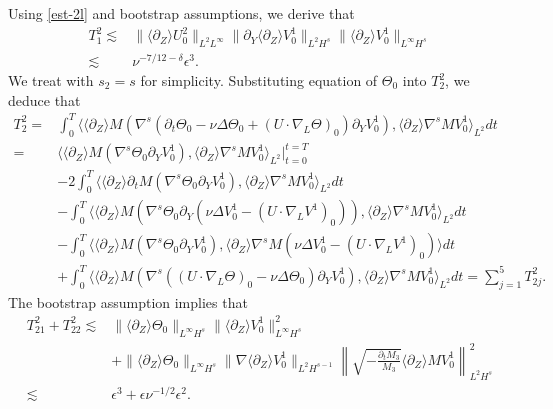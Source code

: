 \documentclass[12pt]{article}
\def\d{\mathrm{d}}
\newcommand{\wtb}{\langle\partial_Z\rangle }
\newcommand{\wtc}{(1,\partial_Z)}
\numberwithin{equation}{section}
\begin{document}
	Using \eqref{est-2l} and bootstrap assumptions, we derive that
	\begin{align*}
		T^2_1\lesssim&\|\wtb U^2_0\|_{L^2L^\infty}\|\partial_Y \wtb V^1_0\|_{L^2H^s}\|\wtb V^1_0\|_{L^{\infty}H^s}\\
		\lesssim&\nu^{-7/12-\delta}\epsilon^3.
	\end{align*}
	We treat with $s_2=s$ for simplicity. Substituting equation of $\Theta_0$ into $T^2_2$, we deduce that
	\begin{align*}
		T^2_2=&\int_{0}^{T}\langle \wtb  M (\nabla^{s} (\partial_t \Theta_0 -\nu \Delta \Theta_0 + (U\cdot\nabla_L \Theta)_0) \partial_Y V^1_0 ), \wtb \nabla^{s} M V^1_0\rangle_{L^2} dt\\
		=&\langle \wtb  M (\nabla^{s} \Theta_0  \partial_Y V^1_0 ), \wtb \nabla^{s} M V^1_0\rangle_{L^2}\big|_{t=0}^{t=T}\\
		&-2\int_{0}^{T}\langle \wtb  \partial_tM (\nabla^{s}  \Theta_0 \partial_Y V^1_0 ), \wtb \nabla^{s} M V^1_0\rangle_{L^2} dt \\
		& -\int_{0}^{T}\langle \wtb  M (\nabla^{s}  \Theta_0 \partial_Y (\nu\Delta V^1_0-(U\cdot\nabla_L V^1)_0) ), \wtb \nabla^{s} M V^1_0\rangle_{L^2} dt\\
		&-\int_{0}^{T}\langle \wtb  M (\nabla^{s}  \Theta_0 \partial_Y  V^1_0 ), \wtb \nabla^{s} M (\nu\Delta V^1_0-(U\cdot\nabla_L V^1)_0) \rangle dt\\
		&+ \int_{0}^{T}\langle \wtb  M (\nabla^{s} ((U\cdot\nabla_L \Theta)_0 - \nu \Delta \Theta_0 ) \partial_Y V^1_0 ), \wtb \nabla^{s} M V^1_0\rangle_{L^2} dt=\sum_{j=1}^{5}T^2_{2j}.
	\end{align*}
	The bootstrap assumption implies that
	\begin{align*}
		T^2_{21}+T^2_{22}\lesssim&\|\wtb \Theta_0\|_{L^{\infty}H^s}\|\wtb  V^1_0\|_{L^\infty H^s}^{2}\\
		&+	\|\wtb \Theta_0\|_{L^\infty H^s}\|\nabla \wtb V^1_0\|_{L^2 H^{s-1}}\left\|\sqrt{-\frac{\partial_tM_3}{M_3}}\wtb M V^1_0\right\|^2_{L^2H^{s}}\\
		\lesssim &\epsilon^3+\epsilon\nu^{-1/2}\epsilon^2.
	\end{align*}
\end{document}
